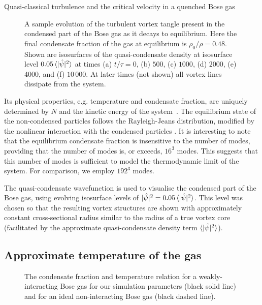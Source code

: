\begin{chapter}{\label{cha:nonequib}Quasi-classical turbulence and the critical velocity in a quenched Bose gas}
\begin{figure}
    \caption{A sample evolution of the turbulent vortex tangle present in the condensed part of the Bose gas as it decays to equilibrium. Here the final condensate fraction of the gas at equilibrium is $\rho_0/\rho = 0.48$. Shown are isosurfaces of the quasi-condensate density at isosurface level $0.05\braket{|\hat{\psi}|^2}$ at times (a) $t/\tau=0$, (b) $500$, (c) $1000$, (d) $2000$, (e) $4000$, and (f) $10\,000$. At later times (not shown) all vortex lines dissipate from the system.
}
    \label{fig:thermal}
\end{figure}

Its physical properties, e.g. temperature and condensate fraction, are uniquely determined by $N$ and the kinetic energy of the system~\cite{PhysRevLett.95.263901}.  The equilibrium state of the non-condensed particles follows the Rayleigh-Jeans distribution, modified by the nonlinear interaction with the condensed particles \cite{PhysRevLett.95.263901}.  It is interesting to note that the equilibrium condensate fraction is insensitive to the number of modes, providing that the number of modes is, or exceeds, $16^3$ modes.  This suggests that this number of modes is sufficient to model the thermodynamic limit of the system. For comparison, we employ $192^3$ modes.

The quasi-condensate wavefunction is used to visualise the condensed part of the Bose gas, using evolving isosurface levels of $|\hat{\psi}|^2 = 0.05\braket{|\hat{\psi}|^2}$. This level was chosen so that the resulting vortex structures are shown with approximately constant cross-sectional radius similar to the radius of a true vortex core (facilitated by the approximate quasi-condensate density term $\braket{|\hat{\psi}|^2}$).

\subsection{Approximate temperature of the gas}
\begin{figure}
\begin{center}
%
\end{center}
\caption{\label{fig:cfvst}The condensate fraction and temperature relation for a weakly-interacting Bose gas for our simulation parameters (black solid line) and for an ideal non-interacting Bose gas (black dashed line).}
\end{figure} 


\end{chapter}
